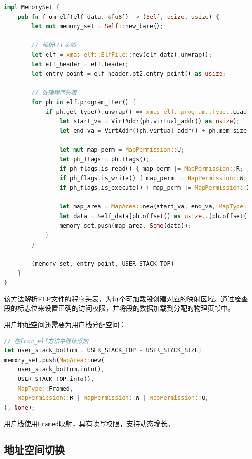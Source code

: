 \begin{lstlisting}[language=Rust,caption={用户地址空间创建}, label={lst:user-memory-set}]
impl MemorySet {
    pub fn from_elf(elf_data: &[u8]) -> (Self, usize, usize) {
        let mut memory_set = Self::new_bare();
        
        // 解析ELF头部
        let elf = xmas_elf::ElfFile::new(elf_data).unwrap();
        let elf_header = elf.header;
        let entry_point = elf_header.pt2.entry_point() as usize;
        
        // 处理程序头表
        for ph in elf.program_iter() {
            if ph.get_type().unwrap() == xmas_elf::program::Type::Load {
                let start_va = VirtAddr(ph.virtual_addr() as usize);
                let end_va = VirtAddr((ph.virtual_addr() + ph.mem_size()) as usize);
                
                let mut map_perm = MapPermission::U;
                let ph_flags = ph.flags();
                if ph_flags.is_read() { map_perm |= MapPermission::R; }
                if ph_flags.is_write() { map_perm |= MapPermission::W; }
                if ph_flags.is_execute() { map_perm |= MapPermission::X; }
                
                let map_area = MapArea::new(start_va, end_va, MapType::Framed, map_perm);
                let data = &elf_data[ph.offset() as usize..(ph.offset() + ph.file_size()) as usize];
                memory_set.push(map_area, Some(data));
            }
        }
        
        (memory_set, entry_point, USER_STACK_TOP)
    }
}
\end{lstlisting}

该方法解析ELF文件的程序头表，为每个可加载段创建对应的映射区域。通过检查段的标志位来设置正确的访问权限，并将段的数据加载到分配的物理页帧中。

用户地址空间还需要为用户栈分配空间：

\begin{lstlisting}[language=Rust,caption={用户栈映射}, label={lst:user-stack-map}]
// 在from_elf方法中继续添加
let user_stack_bottom = USER_STACK_TOP - USER_STACK_SIZE;
memory_set.push(MapArea::new(
    user_stack_bottom.into(),
    USER_STACK_TOP.into(),
    MapType::Framed,
    MapPermission::R | MapPermission::W | MapPermission::U,
), None);
\end{lstlisting}

用户栈使用\lstinline[language=Rust]{Framed}映射，具有读写权限，支持动态增长。

\subsection{地址空间切换}

